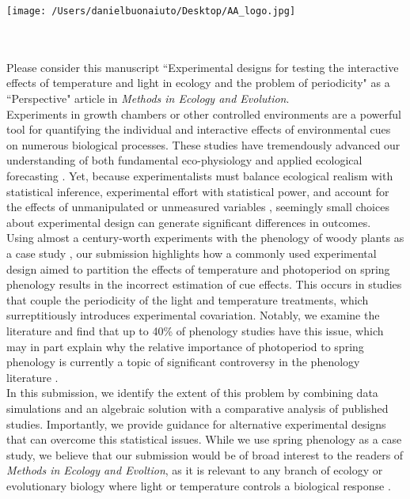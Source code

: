 \documentclass[11.5 pt]{article}
\begin{document}


\def\labelitemi{--}
\parindent=24pt
\noindent\texttt{[image: /Users/danielbuonaiuto/Desktop/AA\_logo.jpg]}
\\\\
\\ %
\vspace{1.5ex}

\noindent Please consider this manuscript ``Experimental designs for testing the interactive effects of temperature and light in ecology and the problem of periodicity" as a ``Perspective" article in \textit{Methods in Ecology and Evolution}.\\

\noindent Experiments in growth chambers or other controlled environments are a powerful tool for quantifying the individual and interactive effects of environmental cues on numerous biological processes. These studies have tremendously advanced our understanding of both fundamental eco-physiology and applied ecological forecasting \citep{Osmond:2004wb}. Yet, because experimentalists must balance ecological realism with statistical inference, experimental effort with statistical power, and account for the effects of unmanipulated or unmeasured variables \citep{schneiner2001}, seemingly small choices about experimental design can generate significant differences in outcomes.\\

\noindent Using almost a century-worth experiments with the phenology of woody plants as a case study \citep{wolkovich2019}, our submission highlights how a commonly used experimental design aimed to partition the effects of temperature and photoperiod on spring phenology results in the incorrect estimation of cue effects. This occurs in studies that couple the periodicity of the light and temperature treatments, which surreptitiously introduces experimental covariation. Notably, we examine the literature and find that up to 40\% of phenology studies have this issue, which may in part explain why the relative importance of photoperiod to spring phenology is currently a topic of significant controversy in the phenology literature \citep{koerner2010a,CHUINE:2010wg,Jennifer:2010un,Zohner:2016uz,WAY:2015aa}. \\

\noindent In this submission, we identify the extent of this problem by combining data simulations and an algebraic solution with a comparative analysis of published studies. Importantly, we provide guidance for alternative experimental designs that can overcome this statistical issues. While we use spring phenology as a case study, we believe that our submission would be of broad interest to the readers of \textit{Methods in Ecology and Evoltion}, as it is relevant to any branch of ecology or evolutionary biology where light or temperature controls a biological response \citep[e.g.,][]{Franklin:2009wo,Brown:2014vn,Casal:2018us}.\\
\end{document}
